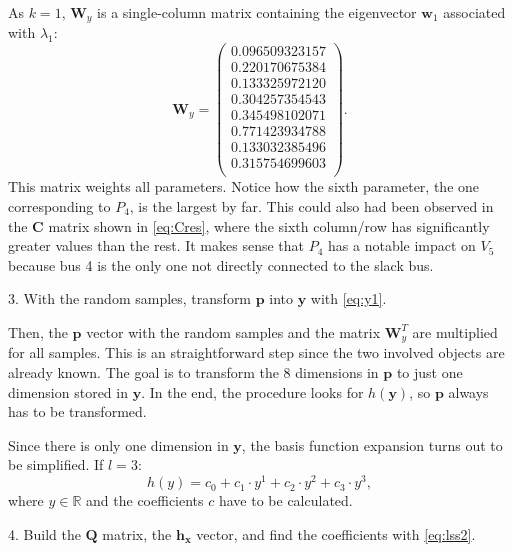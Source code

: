 As $k=1$, $\mathbf{W}_y$ is a single-column matrix containing the eigenvector $\mathbf{w}_1$ associated with $\lambda_1$:
\begin{equation}
  \mathbf{W}_y = \begin{pmatrix}
 0.096509323157 \\
 0.220170675384 \\
 0.133325972120 \\
 0.304257354543 \\
 0.345498102071 \\
 0.771423934788 \\
 0.133032385496 \\
 0.315754699603 \\
  \end{pmatrix}.
  \label{eq:eigenvec}
\end{equation}
This matrix weights all parameters. Notice how the sixth parameter, the one corresponding to $P_4$, is the largest by far. This could also had been observed in the $\mathbf{C}$ matrix shown in \eqref{eq:Cres}, where the sixth column/row has significantly greater values than the rest. It makes sense that $P_4$ has a notable impact on $V_5$ because bus 4 is the only one not directly connected to the slack bus. 

\hspace{0.32cm} 3. With the random samples, transform $\mathbf{p}$ into $\mathbf{y}$ with \eqref{eq:y1}. 

Then, the $\mathbf{p}$ vector with the random samples and the matrix $\mathbf{W}_y^T$ are multiplied for all samples. This is an straightforward step since the two involved objects are already known. The goal is to transform the 8 dimensions in $\mathbf{p}$ to just one dimension stored in $\mathbf{y}$. In the end, the procedure looks for $h(\mathbf{y})$, so $\mathbf{p}$ always has to be transformed. 

Since there is only one dimension in $\mathbf{y}$, the basis function expansion turns out to be simplified. If $l=3$:
\begin{equation}
  h(y) = c_0 + c_1 \cdot y^1 + c_2 \cdot y^2 + c_3 \cdot y^3,
  \label{eq:hy}
\end{equation}
where $y \in \mathbb{R}$ and the coefficients $c$ have to be calculated.  

\hspace{0.32cm} 4. Build the $\mathbf{Q}$ matrix, the $\mathbf{h_x}$ vector, and find the coefficients with \eqref{eq:lss2}. 

